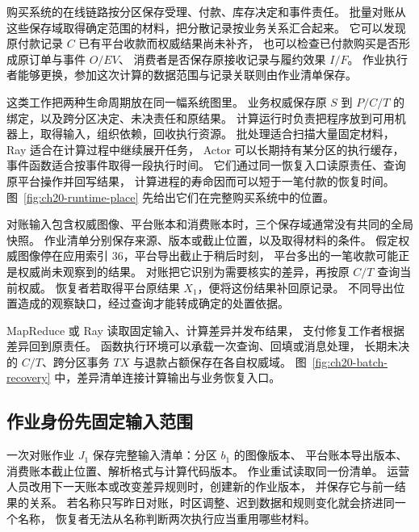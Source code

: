 购买系统的在线链路按分区保存受理、付款、库存决定和事件责任。
批量对账从这些保存域取得确定范围的材料，把分散记录按业务关系汇合起来。
它可以发现原付款记录 $C$ 已有平台收款而权威结果尚未补齐，
也可以检查已付款购买是否形成原订单与事件 $O/EV$、
消费者是否保存原接收记录与履约效果 $I/F$。
作业执行者能够更换，参加这次计算的数据范围与记录关联则由作业清单保存。

这类工作把两种生命周期放在同一幅系统图里。
业务权威保存原 $S$ 到 $P/C/T$ 的绑定，以及跨分区决定、未决责任和原结果。
计算运行时负责把程序放到可用机器上，取得输入，组织依赖，回收执行资源。
批处理适合扫描大量固定材料，Ray 适合在计算过程中继续展开任务，
Actor 可以长期持有某分区的执行缓存，事件函数适合按事件取得一段执行时间。
它们通过同一恢复入口读原责任、查询原平台操作并回写结果，
计算进程的寿命因而可以短于一笔付款的恢复时间。
图~\ref{fig:ch20-runtime-place} 先给出它们在完整购买系统中的位置。


对账输入包含权威图像、平台账本和消费账本时，三个保存域通常没有共同的全局快照。
作业清单分别保存来源、版本或截止位置，以及取得材料的条件。
假定权威图像停在应用索引 36，平台导出截止于稍后时刻，
平台多出的一笔收款可能正是权威尚未观察到的结果。
对账把它识别为需要核实的差异，再按原 $C/T$ 查询当前权威。
恢复者若取得平台原结果 $X_1$，便将这份结果补回原记录。
不同导出位置造成的观察缺口，经过查询才能转成确定的处置依据。


MapReduce 或 Ray 读取固定输入、计算差异并发布结果，
支付修复工作者根据差异回到原责任。
函数执行环境可以承载一次查询、回填或消息处理，
长期未决的 $C/T$、跨分区事务 $TX$ 与退款占额保存在各自权威域。
图~\ref{fig:ch20-batch-recovery} 中，差异清单连接计算输出与业务恢复入口。


\subsection{作业身份先固定输入范围}

一次对账作业 $J_1$ 保存完整输入清单：分区 $b_1$ 的图像版本、
平台账本导出版本、消费账本截止位置、解析格式与计算代码版本。
作业重试读取同一份清单。
运营人员改用下一天账本或改变差异规则时，创建新的作业版本，
并保存它与前一结果的关系。
若名称只写昨日对账，时区调整、迟到数据和规则变化就会挤进同一个名称，
恢复者无法从名称判断两次执行应当重用哪些材料。

